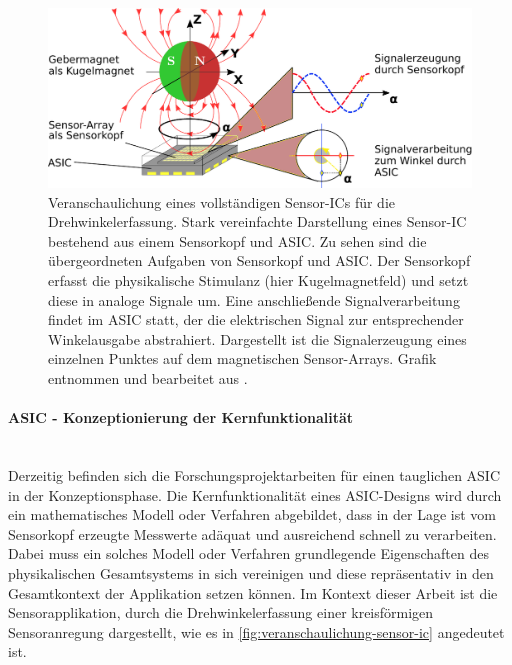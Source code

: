 \vspace{5mm}
\begin{figure}[tbph]
	\centering
	\includegraphics[width=\linewidth]{chapters/images/1-Motivation/Veranschaulichung_Sensor-IC}
	\caption[Veranschaulichung eines vollständigen Sensor-ICs für die Drehwinkelerfassung]{Veranschaulichung eines 
	vollständigen Sensor-ICs für die Drehwinkelerfassung. Stark vereinfachte Darstellung eines Sensor-IC bestehend aus 
	einem Sensorkopf und ASIC. Zu sehen sind die übergeordneten Aufgaben von Sensorkopf und ASIC. Der Sensorkopf 
	erfasst die physikalische Stimulanz (hier Kugelmagnetfeld) und setzt diese in analoge Signale um. Eine 
	anschließende Signalverarbeitung findet im ASIC statt, der die elektrischen Signal zur entsprechender Winkelausgabe 
	abstrahiert. Dargestellt ist die Signalerzeugung eines einzelnen Punktes auf dem magnetischen Sensor-Arrays. Grafik 
	entnommen und bearbeitet aus \cite{Schuethe2020}.}
	\label{fig:veranschaulichung-sensor-ic}
\end{figure}


\clearpage


\paragraph{ASIC - Konzeptionierung der Kernfunktionalität}\label{par:asic-konzeptionierung-der-kernfuntionalitaet}$~$\\


Derzeitig befinden sich die Forschungsprojektarbeiten für einen tauglichen ASIC in der Konzeptionsphase. Die Kernfunktionalität eines ASIC-Designs wird durch ein mathematisches Modell oder Verfahren abgebildet, dass in der Lage ist vom Sensorkopf erzeugte Messwerte adäquat und ausreichend schnell zu verarbeiten. Dabei muss ein solches Modell oder Verfahren grundlegende Eigenschaften des physikalischen Gesamtsystems in sich vereinigen und diese repräsentativ in den Gesamtkontext der Applikation setzen können. Im Kontext dieser Arbeit ist die Sensorapplikation, durch die Drehwinkelerfassung einer kreisförmigen Sensoranregung dargestellt, wie es in \autoref{fig:veranschaulichung-sensor-ic} angedeutet ist.

